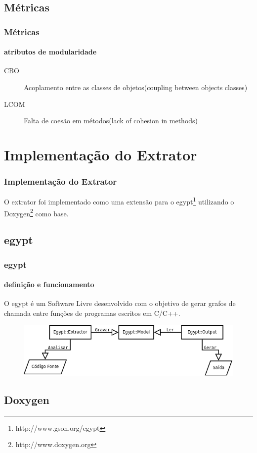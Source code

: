 \documentclass{beamer}
\begin{document}
\subsection{Métricas}

\begin{frame}
\frametitle{Métricas}
\framesubtitle{atributos de modularidade}
  \begin{description}
  \item[CBO] Acoplamento entre as classes de objetos\newline (coupling between objects classes)
  \item[LCOM] Falta de coesão em métodos\newline (lack of cohesion in methods)
  \end{description}
\end{frame}

\section{Implementação do Extrator}

\begin{frame}
\frametitle{Implementação do Extrator}
 O extrator foi implementado como uma extensão para o
 egypt\footnote{http://www.gson.org/egypt} utilizando o
 Doxygen\footnote{http://www.doxygen.org} como base.
\end{frame}

\subsection{egypt}

\begin{frame}
\frametitle{egypt}
\framesubtitle{definição e funcionamento}
 O egypt é um Software Livre desenvolvido com o objetivo de gerar grafos de
 chamada entre funções de programas escritos em C/C++.
 \begin{figure}[h]
 \center
 \includegraphics[scale=0.3]{imagens/egypt-fluxogram}
 \label{fig:egypt-fluxogram}
 \end{figure}
\end{frame}

\subsection{Doxygen}
\end{document}
